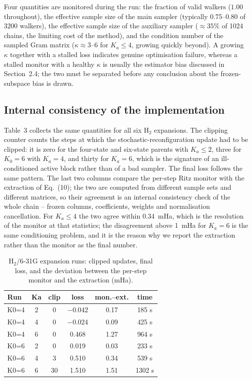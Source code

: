 \documentclass[10pt,a4paper]{article}
\begin{document}
Four quantities are monitored during the run: the fraction of valid walkers ($1.00$ throughout), the effective sample size of the main sampler (typically $0.75$--$0.80$ of $3200$ walkers), the effective sample size of the auxiliary sampler ($\approx35\%$ of 1024 chains, the limiting cost of the method), and the condition number of the sampled Gram matrix ($\kappa\approx3$--$6$ for $K_a\le4$, growing quickly beyond). A growing $\kappa$ together with a stalled loss indicates genuine optimisation failure, whereas a stalled monitor with a healthy $\kappa$ is usually the estimator bias discussed in Section~2.4; the two must be separated before any conclusion about the frozen-subspace bias is drawn.

\subsection{Internal consistency of the implementation}

Table~3 collects the same quantities for all six H$_2$ expansions. The clipping counter counts the steps at which the stochastic-reconfiguration update had to be clipped: it is zero for the four-state and six-state parents with $K_a\le2$, three for $K_0=6$ with $K_a=4$, and thirty for $K_a=6$, which is the signature of an ill-conditioned active block rather than of a bad sampler. The final loss follows the same pattern. The last two columns compare the per-step Ritz monitor with the extraction of Eq.~(10); the two are computed from different sample sets and different matrices, so their agreement is an internal consistency check of the whole chain -- frozen columns, coefficients, weights and normalisation cancellation. For $K_a\le4$ the two agree within 0.34~mHa, which is the resolution of the monitor at that statistics; the disagreement above 1~mHa for $K_a=6$ is the same conditioning problem, and it is the reason why we report the extraction rather than the monitor as the final number.

\begin{table}[t]
\centering
\caption{H$_2$/6-31G expansion runs: clipped updates, final loss, and the deviation between the per-step monitor and the extraction (mHa).}
\label{tab:diag}
\small
\setlength{\tabcolsep}{3.2pt}
\begin{tabular}{@{}lccccc@{}}
\toprule
\textbf{Run} & \textbf{Ka} & \textbf{clip} & \textbf{loss} & \textbf{mon.--ext.} & \textbf{time}\\
\midrule
K0=4 & 2 & 0 & −0.042 & 0.17 & 185 s\\
K0=4 & 4 & 0 & −0.024 & 0.09 & 425 s\\
K0=4 & 6 & 0 & 0.468 & 1.27 & 964 s\\
K0=6 & 2 & 0 & 0.019 & 0.03 & 233 s\\
K0=6 & 4 & 3 & 0.510 & 0.34 & 539 s\\
K0=6 & 6 & 30 & 1.510 & 1.51 & 1302 s\\
\bottomrule
\end{tabular}
\end{table}
\end{document}
